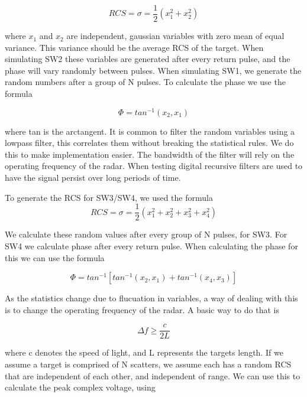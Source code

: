 \documentclass[12pt]{article}
\begin{document}
\begin{equation}
    RCS = \sigma = \frac{1}{2} \left( x_1^2 + x_2^2 \right)
\end{equation}

where $x_1$ and $x_2$ are independent, gaussian variables with zero mean of equal variance. This variance should be the average RCS of the target. When simulating SW2 these variables are generated after every return pulse, and the phase will vary randomly between pulses. When simulating SW1, we generate the random numbers after a group of N pulses. To calculate the phase we use the formula

\begin{equation}
    \Phi = tan^{-1} (x_2, x_1)
\end{equation}

where tan is the arctangent. It is common to filter the random variables using a lowpass filter, this correlates them without breaking the statistical rules. We do this to make implementation easier. The bandwidth of the filter will rely on the operating frequency of the radar. When testing digital recursive filters are used to have the signal persist over long periods of time.

To generate the RCS for SW3/SW4, we used the formula
\begin{equation}
    RCS = \sigma = \frac{1}{2} \left( x_1^2 + x_2^2 +  x_3^2 + x_4^2 \right)
\end{equation}

We calculate these random values after every group of N pulses, for SW3. For SW4 we calculate phase after every return pulse. When calculating the phase for this we can use the formula

\begin{equation}
    \Phi = tan^{-1} \left[ tan^{-1} (x_2, x_1) + tan^{-1} (x_4, x_3)   \right]
\end{equation}

As the statistics change due to flucuation in variables, a way of dealing with this is to change the operating frequency of the radar. A basic way to do that is 

\begin{equation}
    \Delta f \geq \frac{c}{2L} 
\end{equation}

where c denotes the speed of light, and L represents the targets length. If we assume a target is comprised of N scatters, we assume each has a random RCS that are independent of each other, and independent of range. We can use this to calculate the peak complex voltage, using 
\end{document}
